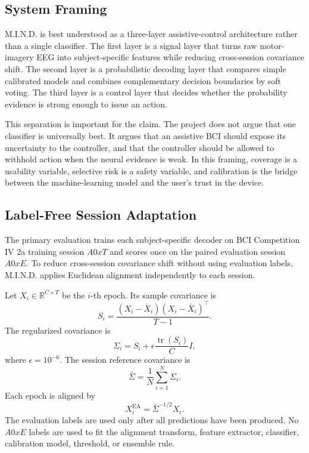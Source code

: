 \documentclass[11pt]{article}
\begin{document}
\subsection{System Framing}

M.I.N.D. is best understood as a three-layer assistive-control architecture
rather than a single classifier. The first layer is a signal layer that turns
raw motor-imagery EEG into subject-specific features while reducing
cross-session covariance shift. The second layer is a probabilistic decoding
layer that compares simple calibrated models and combines complementary
decision boundaries by soft voting. The third layer is a control layer that
decides whether the probability evidence is strong enough to issue an action.

This separation is important for the claim. The project does not argue that
one classifier is universally best. It argues that an assistive BCI should
expose its uncertainty to the controller, and that the controller should be
allowed to withhold action when the neural evidence is weak. In this framing,
coverage is a usability variable, selective risk is a safety variable, and
calibration is the bridge between the machine-learning model and the user's
trust in the device.

\subsection{Label-Free Session Adaptation}

The primary evaluation trains each subject-specific decoder on BCI Competition
IV 2a training session \(A0xT\) and scores once on the paired evaluation
session \(A0xE\). To reduce cross-session covariance shift without using
evaluation labels, M.I.N.D. applies Euclidean alignment independently to each
session.

Let \(X_i \in \mathbb{R}^{C \times T}\) be the \(i\)-th epoch. Its sample
covariance is
\[
  S_i = \frac{(X_i - \bar{X}_i)(X_i - \bar{X}_i)^\top}{T - 1}.
\]
The regularized covariance is
\[
  \Sigma_i = S_i + \epsilon \frac{\operatorname{tr}(S_i)}{C}I,
\]
where \(\epsilon = 10^{-6}\). The session reference covariance is
\[
  \bar{\Sigma} = \frac{1}{N}\sum_{i=1}^{N}\Sigma_i.
\]
Each epoch is aligned by
\[
  X_i^{\mathrm{EA}} = \bar{\Sigma}^{-1/2}X_i.
\]
The evaluation labels are used only after all predictions have been produced.
No \(A0xE\) labels are used to fit the alignment transform, feature extractor,
classifier, calibration model, threshold, or ensemble rule.
\end{document}
